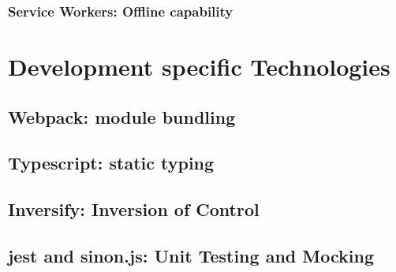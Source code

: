\subsubsection{Service Workers: Offline capability}
\section{Development specific Technologies}
\subsection{Webpack: module bundling}
\subsection{Typescript: static typing}
\subsection{Inversify: Inversion of Control}
\subsection{jest and sinon.js: Unit Testing and Mocking}